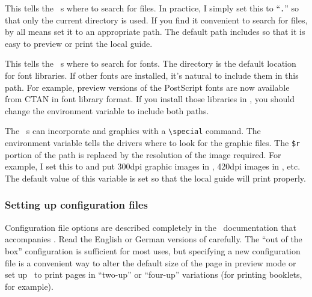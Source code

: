\begin{iplist}[\textnormal]{.25in}

  This tells the \emTeX\ \dvidriver{}s where to search for 
  files.  In practice, I simply set this to ``\verb|.|'' so that only
  the current directory is used.  If you find it convenient to search
  for  files, by all means set it to an appropriate path.
  The default path includes  so that it is easy
  to preview or print the local guide.


  This tells the \emTeX\ \dvidriver{}s where to search for fonts.  The
   directory is the default location for font
  libraries.  If other fonts are installed, it's natural to include them
  in this path.  For example, preview versions of the PostScript fonts
  are now available from CTAN in font library format.  If you install
  those libraries in , you should change the
   environment variable to include both paths.


  The \emTeX\ \dvidriver{}s can incorporate  and  graphics
  with a \verb|\special| command.  The  environment
  variable tells the drivers where to look for the graphic files.  The
  \verb|$r| portion of the path is replaced by the resolution of the
  image required.  For example, I set this to 
  and put 300dpi graphic images in , 420dpi
  images in , etc.  The default value of
  this variable is set so that the local guide will print properly.
\end{iplist}

\subsubsection{Setting up configuration files}

Configuration file 
options are described completely in the \dvidriver\
documentation that accompanies \emTeX.  Read the English or German
versions of \filename{dvidrv.doc} carefully.  The ``out of the box''
configuration is sufficient for most uses, but specifying a new configuration
file is a convenient way to alter the default size of the page in preview
mode or set up \emTeX\ to print pages in ``two-up'' or ``four-up'' variations
(for printing booklets, for example).

